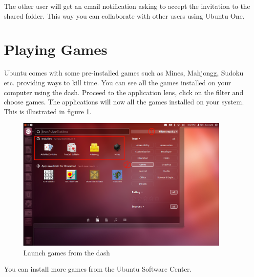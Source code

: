 \par \noindent The other user will get an email notification asking to accept the invitation to the shared folder. This way you can collaborate with other users using Ubuntu One.

\section{Playing Games} 
Ubuntu comes with some pre-installed games such as Mines, Mahjongg, Sudoku etc. providing ways to kill time. You can see all the games installed on your computer using the dash. Proceed to the application lens, click on the filter and choose games. The applications will now all the games installed on your system. This is illustrated in figure \ref{fig:play-games1}. \\

\begin{figure}[h!]	
	\centering
	\includegraphics[width=300pt]{./images/basic-tasks/play-games1.png}
	\caption{Launch games from the dash}	
	\label{fig:play-games1}		
\end{figure}

\par \noindent You can install more games from the Ubuntu Software Center.